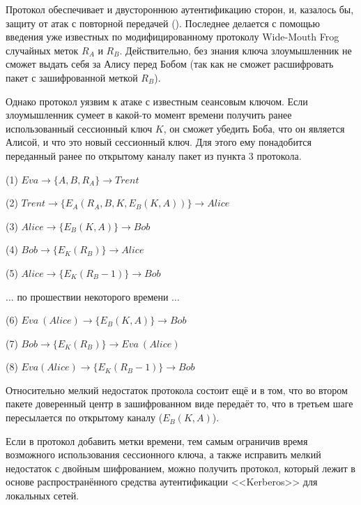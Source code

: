 Протокол обеспечивает и двустороннюю аутентификацию сторон, и, казалось бы, защиту от атак с повторной передачей (). Последнее делается с помощью введения уже известных по модифицированному протоколу Wide-Mouth Frog случайных меток $R_A$ и $R_B$. Действительно, без знания ключа злоумышленник не сможет выдать себя за Алису перед Бобом (так как не сможет расшифровать пакет с зашифрованной меткой $R_B$).

Однако протокол уязвим к атаке с известным сеансовым ключом. Если злоумышленник сумеет в какой-то момент времени получить ранее использованный сессионный ключ $K$, он сможет убедить Боба, что он является Алисой, и что это новый сессионный ключ. Для этого ему понадобится переданный ранее по открытому каналу пакет из пункта 3 протокола.

\begin{protocol}
	\item[(1)] $ Eva \to \{ A, B, R_A \} \to Trent $
	\item[(2)] $ Trent \to \{ E_A \left( R_A, B, K, E_B \left( K, A \right) \right) \}	\to Alice $
	\item[(3)] $ Alice \to \{ E_B \left( K, A \right) \} \to Bob $
	\item[(4)] $ Bob \to \{ E_K \left( R_B \right) \} \to Alice $
	\item[(5)] $ Alice \to \{ E_K \left( R_B - 1 \right) \} \to Bob $
	\item[{}]  $\dots$ по прошествии некоторого времени $\dots$
	\item[(6)] $ Eva~(Alice) \to \{ E_B \left( K, A \right) \} \to Bob $
	\item[(7)] $ Bob \to \{ E_K \left( R_B \right) \} \to Eva~(Alice) $
	\item[(8)] $ Eva (Alice) \to \{ E_K \left( R_B - 1 \right) \} \to Bob $
\end{protocol}

Относительно мелкий недостаток протокола состоит ещё и в том, что во втором пакете доверенный центр в зашифрованном виде передаёт то, что в третьем шаге пересылается по открытому каналу ($E_B \left( K, A \right)$).

Если в протокол добавить метки времени, тем самым ограничив время возможного использования сессионного ключа, а также исправить мелкий недостаток с двойным шифрованием, можно получить протокол, который лежит в основе распространённого средства аутентификации <<Kerberos>> для локальных сетей.


